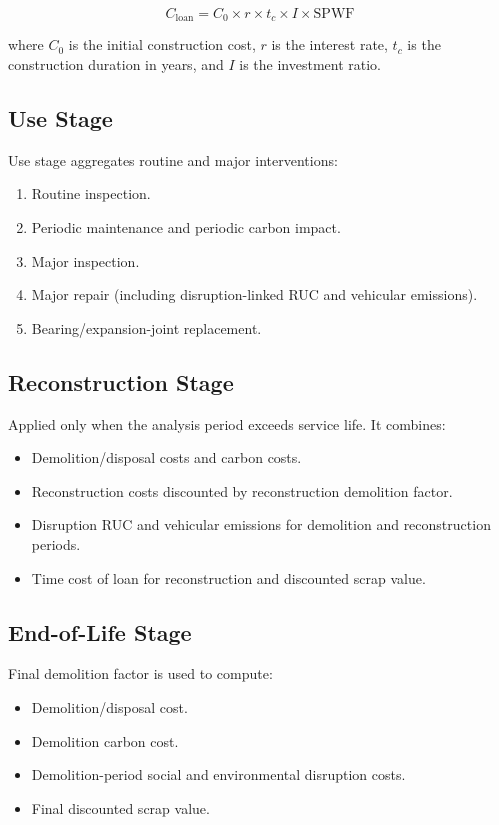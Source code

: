 \documentclass[11pt]{article}
\begin{document}
\begin{equation}
  C_{\text{loan}} = C_{0} \times r \times t_{c} \times I \times \mathrm{SPWF}
  \label{eq:loan}
\end{equation}

where $C_{0}$ is the initial construction cost, $r$ is the interest rate, $t_{c}$ is
the construction duration in years, and $I$ is the investment ratio.

\subsection{Use Stage}
Use stage aggregates routine and major interventions:
\begin{enumerate}
  \item Routine inspection.
  \item Periodic maintenance and periodic carbon impact.
  \item Major inspection.
  \item Major repair (including disruption-linked RUC and vehicular emissions).
  \item Bearing/expansion-joint replacement.
\end{enumerate}

\subsection{Reconstruction Stage}
Applied only when the analysis period exceeds service life. It combines:
\begin{itemize}
  \item Demolition/disposal costs and carbon costs.
  \item Reconstruction costs discounted by reconstruction demolition factor.
  \item Disruption RUC and vehicular emissions for demolition and reconstruction periods.
  \item Time cost of loan for reconstruction and discounted scrap value.
\end{itemize}

\subsection{End-of-Life Stage}
Final demolition factor is used to compute:
\begin{itemize}
  \item Demolition/disposal cost.
  \item Demolition carbon cost.
  \item Demolition-period social and environmental disruption costs.
  \item Final discounted scrap value.
\end{itemize}
\end{document}
